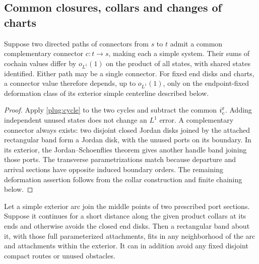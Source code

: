 \subsection{Common closures, collars and changes of charts}

\begin{lemma}\label{lemma:common-closure}
Suppose two directed paths of connectors from $s$ to $t$ admit a common
complementary connector $c:t\to s$, making each a simple system.  Their
sums of cochain values differ by $o_{L^1}(1)$ on the product of all states,
with shared states identified.  Either path may be a single connector.
For fixed end disks and charts, a connector value therefore depends,
up to $o_{L^1}(1)$, only on the endpoint-fixed deformation class of its
exterior simple centerline described below.
\end{lemma}

\begin{proof}
Apply \eqref{plug:cycle} to the two cycles and subtract the common
$i_c^\varepsilon$.  Adding independent unused states does not change an $L^1$
error.  A complementary connector always exists: two disjoint closed
Jordan disks joined by the attached rectangular band form a Jordan disk,
with the unused ports on its boundary.  In its exterior, the
Jordan--Schoenflies theorem gives another handle band joining those
ports.  The transverse parametrizations match because departure and
arrival sections have opposite induced boundary orders.  The remaining
deformation assertion follows from the collar construction and finite
chaining below.
\end{proof}

\begin{lemma}\label{lemma:band-collar}
Let a simple exterior arc join the middle points of two prescribed port
sections.  Suppose it continues for a short distance along the given
product collars at its ends and otherwise avoids the closed end disks.
Then a rectangular band about it, with those full parameterized
attachments, fits in any neighborhood of the arc and attachments within
the exterior.  It can in addition avoid any fixed disjoint compact
routes or unused obstacles.
\end{lemma}

